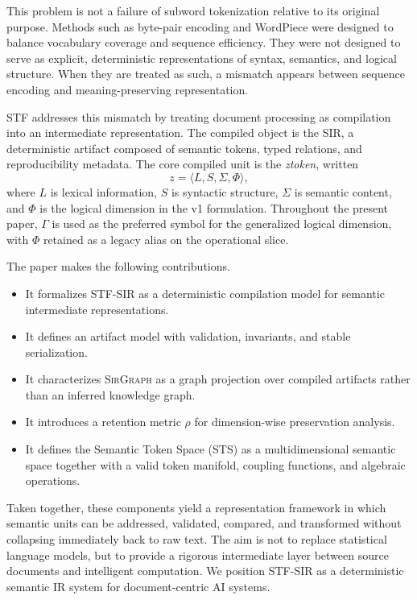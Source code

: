 \documentclass{article}
\newcommand{\STF}{{\normalfont\textsc{STF}}}
\newcommand{\SIR}{{\normalfont\textsc{SIR}}}
\newcommand{\STS}{{\normalfont\textsc{STS}}}
\newcommand{\SirGraphName}{{\normalfont\textsc{SirGraph}}}
\begin{document}
This problem is not a failure of subword tokenization relative to its original purpose. Methods such as byte-pair encoding and WordPiece were designed to balance vocabulary coverage and sequence efficiency. They were not designed to serve as explicit, deterministic representations of syntax, semantics, and logical structure. When they are treated as such, a mismatch appears between sequence encoding and meaning-preserving representation.

\STF{} addresses this mismatch by treating document processing as compilation into an intermediate representation. The compiled object is the \SIR{}, a deterministic artifact composed of semantic tokens, typed relations, and reproducibility metadata. The core compiled unit is the \emph{ztoken}, written
\[
z = \langle L, S, \Sigma, \Phi \rangle,
\]
where \(L\) is lexical information, \(S\) is syntactic structure, \(\Sigma\) is semantic content, and \(\Phi\) is the logical dimension in the v1 formulation. Throughout the present paper, \(\Gamma\) is used as the preferred symbol for the generalized logical dimension, with \(\Phi\) retained as a legacy alias on the operational slice.

The paper makes the following contributions.

\begin{itemize}
\item It formalizes \STF{}-\SIR{} as a deterministic compilation model for semantic intermediate representations.
\item It defines an artifact model with validation, invariants, and stable serialization.
\item It characterizes \SirGraphName{} as a graph projection over compiled artifacts rather than an inferred knowledge graph.
\item It introduces a retention metric \(\rho\) for dimension-wise preservation analysis.
\item It defines the Semantic Token Space (\STS{}) as a multidimensional semantic space together with a valid token manifold, coupling functions, and algebraic operations.
\end{itemize}

Taken together, these components yield a representation framework in which semantic units can be addressed, validated, compared, and transformed without collapsing immediately back to raw text. The aim is not to replace statistical language models, but to provide a rigorous intermediate layer between source documents and intelligent computation.
We position \STF{}-\SIR{} as a deterministic semantic IR system for document-centric AI systems.
\end{document}
